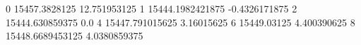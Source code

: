 0 15457.3828125 12.751953125
1 15444.1982421875 -0.4326171875
2 15444.630859375 0.0
4 15447.791015625 3.16015625
6 15449.03125 4.400390625
8 15448.6689453125 4.0380859375
